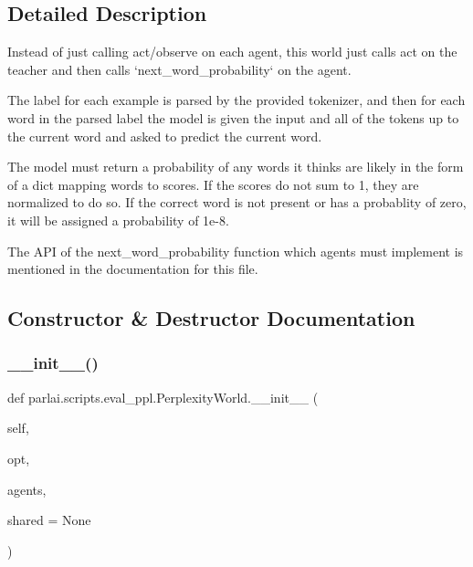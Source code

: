 \subsection{Detailed Description}
\begin{DoxyVerb}Instead of just calling act/observe on each agent, this world just calls act on the
teacher and then calls `next_word_probability` on the agent.

The label for each example is parsed by the provided tokenizer, and then
for each word in the parsed label the model is given the input and all of
the tokens up to the current word and asked to predict the current word.

The model must return a probability of any words it thinks are likely in
the form of a dict mapping words to scores. If the scores do not sum to 1,
they are normalized to do so. If the correct word is not present or has a
probablity of zero, it will be assigned a probability of 1e-8.

The API of the next_word_probability function which agents must implement
is mentioned in the documentation for this file.
\end{DoxyVerb}
 

\subsection{Constructor \& Destructor Documentation}
\mbox{\label{classparlai_1_1scripts_1_1eval__ppl_1_1PerplexityWorld_a28918c916f0ee900c655359388411f84}} 
\subsubsection{\texorpdfstring{\+\_\+\+\_\+init\+\_\+\+\_\+()}{\_\_init\_\_()}}
{\footnotesize\ttfamily def parlai.\+scripts.\+eval\+\_\+ppl.\+Perplexity\+World.\+\_\+\+\_\+init\+\_\+\+\_\+ (\begin{DoxyParamCaption}\item[{}]{self,  }\item[{}]{opt,  }\item[{}]{agents,  }\item[{}]{shared = {\ttfamily None} }\end{DoxyParamCaption})}



